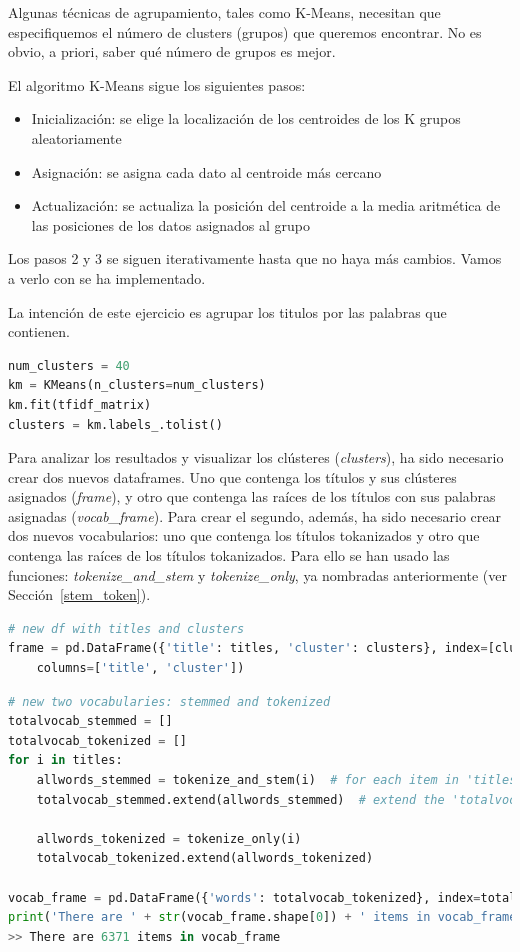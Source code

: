 \documentclass{uimppracticas}
\begin{document}
Algunas técnicas de agrupamiento, tales como K-Means, necesitan que especifiquemos el número de clusters (grupos) que queremos encontrar. No es obvio, a priori, saber qué número de grupos es mejor.


El algoritmo K-Means sigue los siguientes pasos:

\begin{itemize}
	\item Inicialización: se elige la localización de los centroides de los K grupos aleatoriamente
	\item Asignación: se asigna cada dato al centroide más cercano
	\item Actualización: se actualiza la posición del centroide a la media aritmética de las posiciones de los datos asignados al grupo
\end{itemize}

Los pasos 2 y 3 se siguen iterativamente hasta que no haya más cambios. Vamos a verlo con se ha implementado.

La intención de este ejercicio es agrupar los titulos por las palabras que contienen.

\begin{lstlisting}[language=python]
num_clusters = 40
km = KMeans(n_clusters=num_clusters)
km.fit(tfidf_matrix)
clusters = km.labels_.tolist()
\end{lstlisting}

Para analizar los resultados y visualizar los clústeres (\textit{clusters}), ha sido necesario crear dos nuevos dataframes. Uno que contenga los títulos y sus clústeres asignados (\textit{frame}), y otro que contenga las raíces de los títulos con sus palabras asignadas (\textit{vocab\_frame}). Para crear el segundo, además, ha sido necesario crear dos nuevos vocabularios: uno que contenga los títulos tokanizados y otro que contenga las raíces de los títulos tokanizados. Para ello se han usado las funciones: \textit{tokenize\_and\_stem} y \textit{tokenize\_only}, ya nombradas anteriormente (ver Sección~\ref{stem_token}).

\begin{lstlisting}[language=python]
# new df with titles and clusters
frame = pd.DataFrame({'title': titles, 'cluster': clusters}, index=[clusters], 
	columns=['title', 'cluster'])
\end{lstlisting}

\begin{lstlisting}[language=python]
# new two vocabularies: stemmed and tokenized
totalvocab_stemmed = []
totalvocab_tokenized = []
for i in titles:
	allwords_stemmed = tokenize_and_stem(i)  # for each item in 'titles', tokenize/stem
	totalvocab_stemmed.extend(allwords_stemmed)  # extend the 'totalvocab_stemmed' list

	allwords_tokenized = tokenize_only(i)
	totalvocab_tokenized.extend(allwords_tokenized)
	
vocab_frame = pd.DataFrame({'words': totalvocab_tokenized}, index=totalvocab_stemmed)
print('There are ' + str(vocab_frame.shape[0]) + ' items in vocab_frame')
>> There are 6371 items in vocab_frame
\end{lstlisting}
\end{document}
